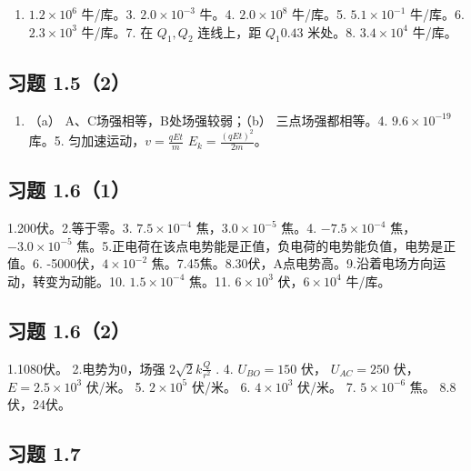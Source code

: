 \begin{enumerate}
\def\labelenumi{\arabic{enumi}.}
\setcounter{enumi}{1}
\tightlist
\item
  \(1.2 \times 10^{6}\) 牛/库。3. \(2.0 \times 10^{-3}\) 牛。4.
  \(2.0 \times 10^{8}\) 牛/库。5. \(5.1 \times 10^{-1}\) 牛/库。6.
  \(2.3 \times 10^{3}\) 牛/库。7. 在 \(Q_{1}, Q_{2}\) 连线上，距
  \(Q_{1} 0.43\) 米处。8. \(3.4 \times 10^{4}\) 牛/库。
\end{enumerate}

\subsection{习题 1.5（2）}\label{ux4e60ux9898-1.52-1}

\begin{enumerate}
\def\labelenumi{\arabic{enumi}.}
\setcounter{enumi}{2}
\tightlist
\item
  （a） A、C场强相等，B处场强较弱；（b） 三点场强都相等。4.
  \(9.6 \times 10^{-19}\) 库。5. 匀加速运动，\(v = \frac{qEt}{m}\)
  \(E_{k} = \frac{(qEt)^{2}}{2m}\)。
\end{enumerate}

\subsection{习题 1.6（1）}\label{ux4e60ux9898-1.61-1}

1.200伏。2.等于零。3. \(7.5 \times 10^{-4}\) 焦，\(3.0 \times 10^{-5}\)
焦。4. \(-7.5 \times 10^{-4}\) 焦，\(-3.0 \times 10^{-5}\)
焦。5.正电荷在该点电势能是正值，负电荷的电势能负值，电势是正值。6.
-5000伏，\(4 \times 10^{-2}\)
焦。7.45焦。8.30伏，A点电势高。9.沿着电场方向运动，转变为动能。10.
\(1.5 \times 10^{-4}\) 焦。11. \(6 \times 10^{3}\)
伏，\(6 \times 10^{4}\) 牛/库。

\subsection{习题 1.6（2）}\label{ux4e60ux9898-1.62-1}

1.1080伏。 2.电势为0，场强 \(2\sqrt{2}k\frac{Q}{r^{2}}\) . 4.
\(U_{BO}=150\) 伏， \(U_{AC}=250\) 伏， \(E=2.5\times10^{3}\) 伏/米。 5.
\(2\times10^{5}\) 伏/米。 6. \(4\times10^{3}\) 伏/米。 7.
\(5\times10^{-6}\) 焦。 8.8伏，24伏。

\subsection{习题 1.7}\label{ux4e60ux9898-1.7-1}

